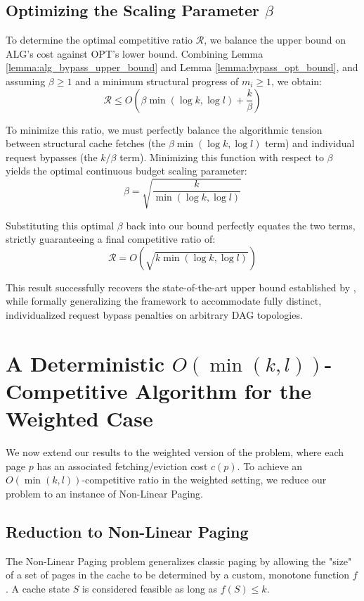 \documentclass[a4paper]{article}
\begin{document}
\subsection*{Optimizing the Scaling Parameter $\beta$}

To determine the optimal competitive ratio $\mathcal{R}$, we balance the upper bound on ALG's cost against OPT's lower bound. Combining Lemma \ref{lemma:alg_bypass_upper_bound} and Lemma \ref{lemma:bypass_opt_bound}, and assuming $\beta \ge 1$ and a minimum structural progress of $m_i \ge 1$, we obtain:
$$ \mathcal{R} \le O\left( \beta \min(\log k, \log l) + \frac{k}{\beta} \right) $$

To minimize this ratio, we must perfectly balance the algorithmic tension between structural cache fetches (the $\beta \min(\log k, \log l)$ term) and individual request bypasses (the $k/\beta$ term). Minimizing this function with respect to $\beta$ yields the optimal continuous budget scaling parameter:
$$ \beta = \sqrt{\frac{k}{\min(\log k, \log l)}} $$

Substituting this optimal $\beta$ back into our bound perfectly equates the two terms, strictly guaranteeing a final competitive ratio of:
$$ \mathcal{R} = O\left(\sqrt{k \min(\log k, \log l)}\right) $$

This result successfully recovers the state-of-the-art upper bound established by \cite{dallot2024dependency}, while formally generalizing the framework to accommodate fully distinct, individualized request bypass penalties on arbitrary DAG topologies.

\section{A Deterministic $O(\min(k,l))$-Competitive Algorithm for the \\ Weighted Case}
We now extend our results to the weighted version of the problem, where each page $p$ has an associated fetching/eviction cost $c(p)$. To achieve an $O(\min(k,l))$-competitive ratio in the weighted setting, we reduce our problem to an instance of Non-Linear Paging. 

\subsection{Reduction to Non-Linear Paging}
The Non-Linear Paging problem generalizes classic paging by allowing the "size" of a set of pages in the cache to be determined by a custom, monotone function $f$. A cache state $S$ is considered feasible as long as $f(S) \le k$. 
\end{document}
